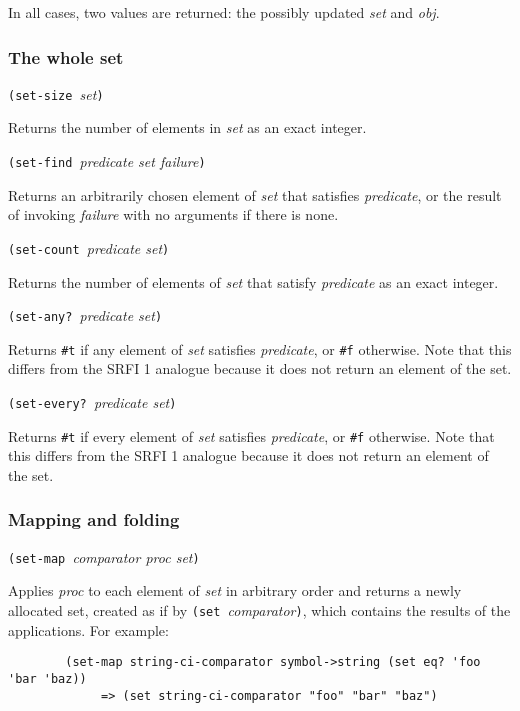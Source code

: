In all cases, two values are returned: the possibly updated \emph{set}
and \emph{obj}.

\hypertarget{Thewholeset}{\subsubsection{The whole
set}\label{Thewholeset}}

\texttt{(set-size\ }\emph{set}\texttt{)}

Returns the number of elements in \emph{set} as an exact integer.

\texttt{(set-find\ }\emph{predicate set failure}\texttt{)}

Returns an arbitrarily chosen element of \emph{set} that satisfies
\emph{predicate}, or the result of invoking \emph{failure} with no
arguments if there is none.

\texttt{(set-count\ }\emph{predicate set}\texttt{)}

Returns the number of elements of \emph{set} that satisfy
\emph{predicate} as an exact integer.

\texttt{(set-any?\ }\emph{predicate set}\texttt{)}

Returns \texttt{\#t} if any element of \emph{set} satisfies
\emph{predicate}, or \texttt{\#f} otherwise. Note that this differs from
the SRFI 1 analogue because it does not return an element of the set.

\texttt{(set-every?\ }\emph{predicate set}\texttt{)}

Returns \texttt{\#t} if every element of \emph{set} satisfies
\emph{predicate}, or \texttt{\#f} otherwise. Note that this differs from
the SRFI 1 analogue because it does not return an element of the set.

\hypertarget{Mappingandfolding}{\subsubsection{Mapping and
folding}\label{Mappingandfolding}}

\texttt{(set-map\ }\emph{comparator proc set}\texttt{)}

Applies \emph{proc} to each element of \emph{set} in arbitrary order and
returns a newly allocated set, created as if by
\texttt{(set\ }\emph{comparator}\texttt{)}, which contains the results
of the applications. For example:

\begin{verbatim}
        (set-map string-ci-comparator symbol->string (set eq? 'foo 'bar 'baz))
             => (set string-ci-comparator "foo" "bar" "baz")
\end{verbatim}

